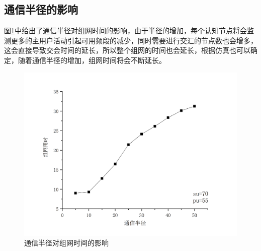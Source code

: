 \documentclass[a4paper,AutoFakeBold,oneside,12pt]{book}
\begin{document}
  \subsection{通信半径的影响}
  图\ref{data-1R}中给出了通信半径对组网时间的影响，由于半径的增加，每个认知节点将会监测更多的主用户活动引起可用频段的减少，同时需要进行交汇的节点数也会增多，这会直接导致交会时间的延长，所以整个组网的时间也会延长，根据仿真也可以确定，随着通信半径的增加，组网时间将会不断延长。
   \begin{figure}[htbp]
\centering %
\includegraphics[scale=0.3]{pictures/data-1R.png} 
\caption{通信半径对组网时间的影响 } %
\label{data-1R}
\end{figure}
 
\end{document}
